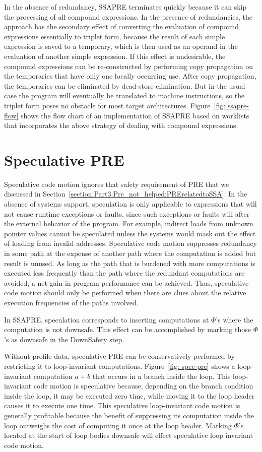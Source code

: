 In the absence of redundancy, SSAPRE terminates quickly because it can skip
the processing of all compound expressions.  In the presence of redundancies,
the approach has the secondary effect of converting the evaluation of compound
expressions essentially to triplet form, because the result of each simple
expression is saved to a temporary, which is then used as an operand in the
evaluation of another simple expression.  If this effect is undesirable,
the compound expressions can be re-constructed by performing copy propagation
on the temporaries that have only one locally occurring use.  After copy
propagation, the temporaries can be eliminated by dead-store elimination.  But
in the usual case the program will eventually be translated to machine
instructions, so the triplet form poses no obstacle for most target 
architectures.  Figure~\ref{fig: ssapre-flow} shows the flow chart of an
implementation of SSAPRE based on worklists that incorporates the above
strategy of dealing with compound expressions.
 
\section{Speculative PRE}

Speculative code motion ignores that safety requirement of PRE that we
discussed in Section~\ref{section:Part3:Pre_not_helped:PRErelatedtoSSA}.
In the absence of systems support, speculation is only applicable to 
expressions that will not cause runtime exceptions or faults, since such
exceptions or faults will after the external behavior of the program.  
For example, indirect loads from unknown pointer values cannot be speculated
unless the systems would mask out the effect of loading from invalid addresses.
Speculative code motion suppresses
redundancy in some path at the expense of another path where the computation 
is added but result is unused.  As long as the path that is burdened with
more computations is executed less frequently than the path where the
redundant computations are avoided, a net gain in program performance can be
achieved.  Thus, speculative code motion should only be performed when there
are clues about the relative execution frequencies of the paths involved.

In SSAPRE, speculation corresponds to inserting computations at $\Phi$'s where
the computation is not downsafe.  This effect can be accomplished by 
marking those $\Phi$'s as downsafe in the DownSafety step.

Without profile data, speculative PRE can be conservatively performed by
restricting it to loop-invariant computations.  Figure~\ref{fig: spec-pre} shows
a loop-invariant computation $a+b$ that occurs in a branch inside the loop.
This loop-invariant code motion is speculative because, depending on the
branch condition inside the loop, it may be executed zero time, while moving it
to the loop header causes it to execute one time. This speculative 
loop-invariant code motion is generally profitable because the benefit of
suppressing its computation inside the loop outweighs the cost of computing it
once at the loop header.  Marking $\Phi$'s located at the start of loop bodies
downsafe will effect speculative loop invariant code motion\cite{Lo98}. 

